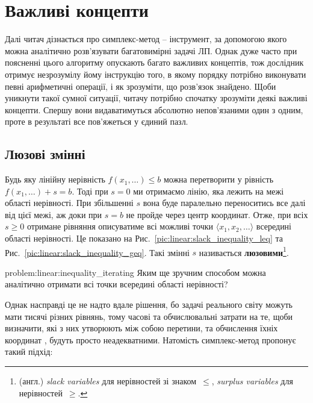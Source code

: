 \documentclass[\main/book.tex]{subfiles}
\begin{document}
\section{Важливі концепти}

Далі читач дізнається про симплекс-метод -- інструмент, за допомогою якого можна аналітично розв'язувати багатовимірні задачі ЛП. Однак дуже часто при поясненні цього алгоритму опускають багато важливих концептів, тож дослідник отримує незрозумілу йому інструкцію того, в якому порядку потрібно виконувати певні арифметичні операції, і як зрозуміти, що розв'язок знайдено. Щоби уникнути такої сумної ситуації, читачу потрібно спочатку зрозуміти деякі важливі концепти. Спершу вони видаватимуться абсолютно непов'язаними один з одним, проте в результаті все пов'яжеться у єдиний пазл.

\subsection{Люзові змінні}

Будь яку лінійну нерівність $f(x_1, \ldots) \leq b$ можна перетворити у рівність $f(x_1, \ldots) + s = b$. Тоді при ${s=0}$ ми отримаємо лінію, яка лежить на межі області нерівності. При збільшенні $s$ вона буде паралельно переноситись все далі від цієї межі, аж доки при $s=b$ не пройде через центр координат. Отже, при всіх $s \geq 0$ отримане рівняння описуватиме всі можливі точки $\langle x_1, x_2, \ldots \rangle$ всередині області нерівності. Це показано на Рис.~\ref{pic:linear:slack_inequality_leq} та Рис.~\ref{pic:linear:slack_inequality_geq}. Такі змінні $s$ називається \textbf{люзовими}\footnote{(англ.) \textit{slack variables} для нерівностей зі знаком~\flqq{}$\leq$\frqq{}, \textit{surplus variables} для нерівностей~\flqq{}$\geq$\frqq{}.}.

\begin{problem}{problem:linear:inequality_iterating}
 Яким ще зручним способом можна аналітично отримати всі точки всередині області нерівності?
\end{problem}

Однак насправді це не надто вдале рішення, бо задачі \flqq{}реального світу\frqq{} можуть мати тисячі різних рівнянь, тому часові та обчислювальні затрати на те, щоби визначити, які з них утворюють між собою перетини, та обчислення їхніх координат
, будуть просто неадекватними. Натомість симплекс-метод пропонує такий підхід:
\end{document}

